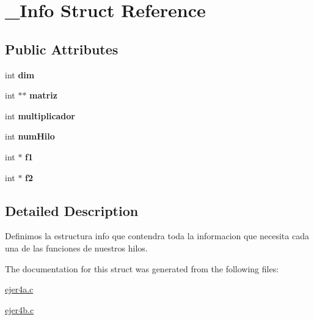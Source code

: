 \hypertarget{struct__Info}{}\section{\+\_\+\+Info Struct Reference}
\label{struct__Info}
\subsection*{Public Attributes}
\begin{DoxyCompactItemize}
\item 
int {\bfseries dim}\hypertarget{struct__Info_a284925e948f9ed02a1480feaaba965b3}{}\label{struct__Info_a284925e948f9ed02a1480feaaba965b3}

\item 
int $\ast$$\ast$ {\bfseries matriz}\hypertarget{struct__Info_a4e86474de4250cd087451bc7691f561f}{}\label{struct__Info_a4e86474de4250cd087451bc7691f561f}

\item 
int {\bfseries multiplicador}\hypertarget{struct__Info_a269d96fd7648fd791f414125345c47f3}{}\label{struct__Info_a269d96fd7648fd791f414125345c47f3}

\item 
int {\bfseries num\+Hilo}\hypertarget{struct__Info_a3e01c2c8d8ec57dc3cac33a309825acd}{}\label{struct__Info_a3e01c2c8d8ec57dc3cac33a309825acd}

\item 
int $\ast$ {\bfseries f1}\hypertarget{struct__Info_a8a9375aff2f66674f8cdadad57ef1a53}{}\label{struct__Info_a8a9375aff2f66674f8cdadad57ef1a53}

\item 
int $\ast$ {\bfseries f2}\hypertarget{struct__Info_a4af7963c8a87b0dd5a124e3fac28a33e}{}\label{struct__Info_a4af7963c8a87b0dd5a124e3fac28a33e}

\end{DoxyCompactItemize}


\subsection{Detailed Description}
Definimos la estructura info que contendra toda la informacion que necesita cada una de las funciones de nuestros hilos. 

The documentation for this struct was generated from the following files\+:\begin{DoxyCompactItemize}
\item 
\hyperlink{ejer4a_8c}{ejer4a.\+c}\item 
\hyperlink{ejer4b_8c}{ejer4b.\+c}\end{DoxyCompactItemize}
